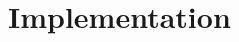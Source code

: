 \documentclass{scrartcl}
\begin{document}

\section{Implementation}\label{implementation}
\end{document}
